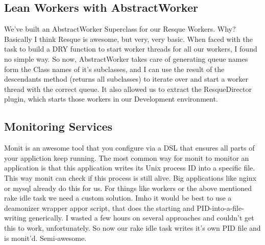 \subsection{Lean Workers with AbstractWorker}

We’ve built an AbstractWorker Superclass for our Resque Workers. Why?
Basically I think Resque is awesome, but very, very basic.
When faced with the task to build a DRY function to start worker threads for all our workers, I found no simple way. So now, AbstractWorker takes care of generating queue names form the Class names of it’s subclasses, and I can use the result of the descendants method (returns all subclasses) to iterate over and start a worker thread with the correct queue. It also allowed us to extract the ResqueDirector plugin, which starts those workers in our Development environment.

\subsection{Monitoring Services}

Monit is an awesome tool that you configure via a DSL that ensures all parts of your appliction keep running. The most common way for monit to monitor an application is that this application writes its Unix process ID into a specific file. This way monit can check if this process is still alive. Big applications like nginx or mysql already do this for us. For things like workers or the above mentioned rake idle task we need a custom solution. Imho it would be best to use a deamonizer wrapper appor script, that does the starting and PID-into-a-file-writing generically. I wasted a few hours on several approaches and couldn’t get this to work, unfortunately.
So now our rake idle task writes it’s own PID file and is monit’d. Semi-awesome.

